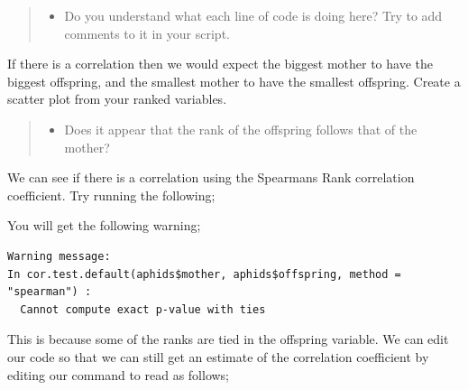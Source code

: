 \documentclass[
]{book}
\newenvironment{Shaded}{\begin{snugshade}}{\end{snugshade}}
\newcommand{\AttributeTok}[1]{\textcolor[rgb]{0.13,0.29,0.53}{#1}}
\newcommand{\ConstantTok}[1]{\textcolor[rgb]{0.56,0.35,0.01}{#1}}
\newcommand{\FunctionTok}[1]{\textcolor[rgb]{0.13,0.29,0.53}{\textbf{#1}}}
\newcommand{\NormalTok}[1]{#1}
\newcommand{\SpecialCharTok}[1]{\textcolor[rgb]{0.81,0.36,0.00}{\textbf{#1}}}
\newcommand{\StringTok}[1]{\textcolor[rgb]{0.31,0.60,0.02}{#1}}
\providecommand{\tightlist}{%
  \setlength{\itemsep}{0pt}\setlength{\parskip}{0pt}}
\begin{document}
\begin{quote}
\begin{itemize}
\tightlist
\item
  Do you understand what each line of code is doing here? Try to add comments to it in your script.
\end{itemize}
\end{quote}

If there is a correlation then we would expect the biggest mother to have the biggest offspring, and the smallest mother to have the smallest offspring. Create a scatter plot from your ranked variables.

\begin{quote}
\begin{itemize}
\tightlist
\item
  Does it appear that the rank of the offspring follows that of the mother?
\end{itemize}
\end{quote}

We can see if there is a correlation using the Spearmans Rank correlation coefficient. Try running the following;

\begin{Shaded}
\end{Shaded}

You will get the following warning;

\begin{verbatim}
Warning message:
In cor.test.default(aphids$mother, aphids$offspring, method = "spearman") :
  Cannot compute exact p-value with ties
\end{verbatim}

This is because some of the ranks are tied in the offspring variable. We can edit our code so that we can still get an estimate of the correlation coefficient by editing our command to read as follows;

\begin{Shaded}
\end{Shaded}
\end{document}
